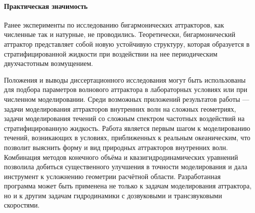 




\paragraph{Практическая значимость} 

Ранее эксперименты по исследованию бигармонических аттракторов, как численные так и натурные, не проводились. Теоретически, бигармонический аттрактор представляет собой новую устойчивую структуру, которая образуется в стратифицированной жидкости при воздействии на нее периодическим двухчастотным возмущением.

Положения и выводы диссертационного исследования могут быть использованы для подбора параметров  волнового аттрактора в лабораторных условиях или при численном моделировании. Среди возможных приложений результатов работы — задачи моделирования аттракторов внутренних волн на сложных геометриях, задачи моделирования течений со сложным спектром частотных воздействий на стратифицированную жидкость. Работа является первым шагом к моделированию течений, возникающих в условиях, приближенных к реальным океаническим, что позволит выяснить форму и вид природных аттракторов внутренних волн. Комбинация методов конечного объёма и квазигидродинамических уравнений позволила добиться существенного улучшения в точности моделирования и дала инструмент к  усложнению геометрии расчётной области. Разработанная программа может быть применена не только к задачам моделирования аттрактора, но и к другим задачам гидродинамики с дозвуковыми и трансзвуковыми скоростями.

